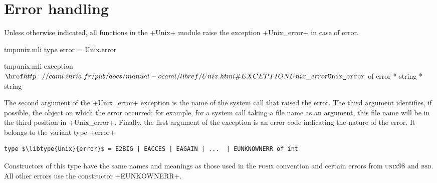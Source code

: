 \section{Error handling}

Unless otherwise indicated, all functions in the \ml+Unix+ module
raise the exception \ml+Unix_error+ in case of error.
%
\begin{codefile}{tmpunix.mli}
type error = Unix.error
\end{codefile}
%
\begin{listingcodefile}{tmpunix.mli}
exception $\libexn{Unix}{Unix\_error}$ of error * string * string
\end{listingcodefile}
%
The second argument of the \ml+Unix_error+ exception is the name of
the system call that raised the error. The third argument identifies,
if possible, the object on which the error occurred; for example, for
a system call taking a file name as an argument, this file name will be
in the third position in \ml+Unix_error+. Finally, the first argument
of the exception is an error code indicating the nature of the
error. It belongs to the variant type \ml+error+
%
\begin{lstlisting}
type $\libtype{Unix}{error}$ = E2BIG | EACCES | EAGAIN | ...  | EUNKNOWNERR of int
\end{lstlisting}
%
Constructors of this type have the same names and meanings as those
used in the \textsc{posix} convention and  certain errors from
\textsc{unix98} and \textsc{bsd}. All other errors use the constructor \ml+EUNKOWNERR+.

